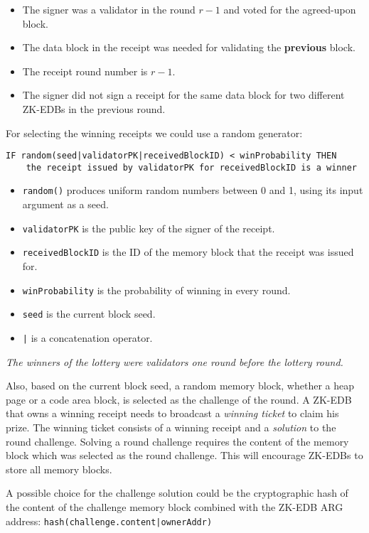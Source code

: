 \documentclass[a4paper]{report}
\begin{document}
    \begin{itemize}
        \item The signer was a validator in the round \(r - 1\) and voted for the agreed-upon block.
        \item The data block in the receipt was needed for validating the \textbf{previous} block.
        \item The receipt round number is \(r - 1\).
        \item The signer did not sign a receipt for the same data block for two different ZK-EDBs in the previous round.
    \end{itemize}
    For selecting the winning receipts we could use a random generator:
    \begin{verbatim}
IF random(seed|validatorPK|receivedBlockID) < winProbability THEN
    the receipt issued by validatorPK for receivedBlockID is a winner
    \end{verbatim}
    \begin{itemize}
        \item \texttt{random()} produces uniform random numbers between 0 and 1, using its input argument as a seed.
        \item \texttt{validatorPK} is the public key of the signer of the receipt.
        \item \texttt{receivedBlockID} is the ID of the memory block that the receipt was issued for.
        \item \texttt{winProbability} is the probability of winning in every round.
        \item \texttt{seed} is the current block seed.
        \item \texttt{|} is a concatenation operator.
    \end{itemize}

    \emph{The winners of the lottery were validators one round before the lottery round.}

    Also, based on the current block seed, a random memory block, whether a heap page or a code area block, is
    selected as the challenge of the round. A ZK-EDB that owns a winning receipt needs to broadcast a \emph{winning
    ticket} to claim his prize. The winning ticket consists of a winning receipt and a \emph{solution} to the round
    challenge. Solving a round challenge requires the content of the memory block which was selected as the round
    challenge. This will encourage ZK-EDBs to store all memory blocks.

    A possible choice for the challenge solution could be the cryptographic hash of the content of the challenge
    memory block combined with the ZK-EDB ARG address: \texttt{hash(challenge.content|ownerAddr)}
\end{document}
